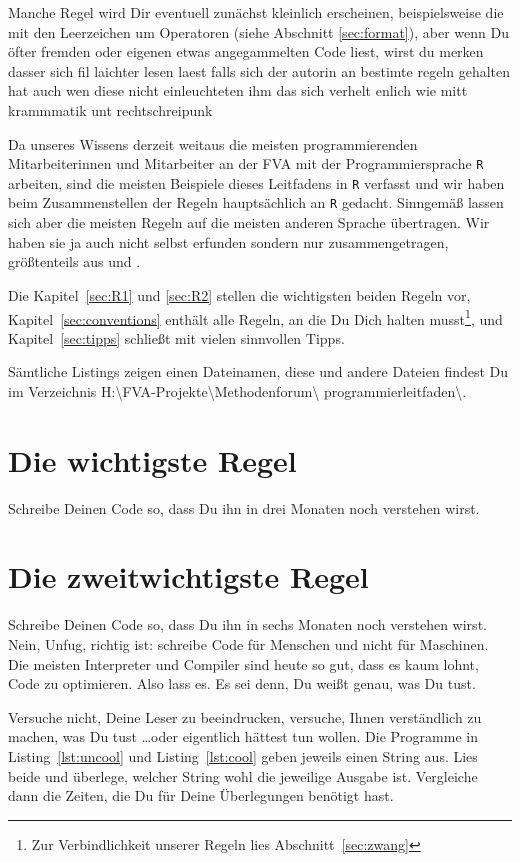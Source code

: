 \documentclass[twoside]{scrreprt}
\providecommand{\R}{\texttt{R}}
\providecommand{\proot}{%
H:\textbackslash{}FVA-Projekte\textbackslash{}Methodenforum\textbackslash{}%
}
\providecommand{\pdir}{\proot{}programmierleitfaden\textbackslash{}}
\begin{document}
Manche Regel wird Dir eventuell zun\"a{}chst kleinlich erscheinen,
beispielsweise die mit den Leerzeichen  um  Operatoren (siehe Abschnitt
\ref{sec:format}), aber wenn Du \"o{}fter fremden oder eigenen etwas
angegammelten Code liest, wirst
du merken dasser sich fil laichter lesen laest falls sich der autorin an
bestimte regeln gehalten hat auch wen diese nicht einleuchteten ihm das
sich verhelt enlich wie mitt krammmatik unt rechtschreipunk

Da unseres Wissens derzeit weitaus die meisten programmierenden Mitarbeiterinnen
und Mitarbeiter an der FVA mit der Programmiersprache \R{} arbeiten, sind die
meisten Beispiele dieses Leitfadens in \R{} verfasst und wir haben beim
Zusammenstellen der Regeln haupts\"a{}chlich an \R{} gedacht.
Sinngem\"a{}\ss{} lassen sich aber die meisten Regeln auf die meisten
anderen Sprache \"u{}bertragen. Wir haben sie ja auch nicht selbst erfunden
sondern nur zusammengetragen, gr\"o{}\ss{}tenteils aus \cite{cc} und \cite{wsp}.

Die Kapitel~\ref{sec:R1} und \ref{sec:R2} stellen die wichtigsten beiden Regeln
vor, Kapitel~\ref{sec:conventions} enth\"a{}lt alle Regeln, an die Du Dich
halten musst\footnote{
  Zur Verbindlichkeit unserer Regeln lies Abschnitt~\ref{sec:zwang}
}, und Kapitel~\ref{sec:tipps} schlie\ss{}t mit vielen sinnvollen Tipps.

S\"a{}mtliche Listings zeigen einen Dateinamen, diese und andere  Dateien 
findest Du im Verzeichnis  
\pdir.


\section{Die wichtigste Regel\label{sec:R1}}
Schreibe Deinen Code so, dass Du ihn in drei Monaten noch verstehen wirst.

\section{Die zweitwichtigste Regel\label{sec:R2}}
Schreibe Deinen Code so, dass Du ihn in sechs Monaten noch verstehen wirst. 
Nein, Unfug, richtig ist: schreibe Code f\"u{}r Menschen und nicht f\"u{}r 
Maschinen. Die meisten Interpreter und Compiler sind heute so gut, dass es
kaum lohnt, Code zu optimieren. Also lass es. Es sei denn, Du wei\ss{}t
genau, was Du tust. 

Versuche nicht, Deine Leser zu beeindrucken, versuche, Ihnen verst\"a{}ndlich zu
machen, was Du tust \ldots oder eigentlich h\"a{}ttest tun wollen.
Die Programme in  Listing~\ref{lst:uncool} und Listing~\ref{lst:cool} geben
jeweils einen String aus. Lies beide und
\"u{}berlege, welcher String wohl die jeweilige Ausgabe ist. Vergleiche dann die
Zeiten, die Du f\"u{}r Deine \"U{}berlegungen ben\"o{}tigt 
hast. 

\end{document}
